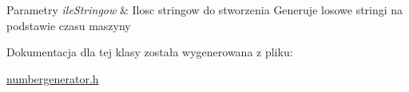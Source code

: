 \begin{DoxyParams}{Parametry}
{\em ile\-Stringow} & Ilosc stringow do stworzenia Generuje losowe stringi na podstawie czasu maszyny \\
\hline
\end{DoxyParams}


Dokumentacja dla tej klasy została wygenerowana z pliku\-:\begin{DoxyCompactItemize}
\item 
\hyperlink{numbergenerator_8h}{numbergenerator.\-h}\end{DoxyCompactItemize}
